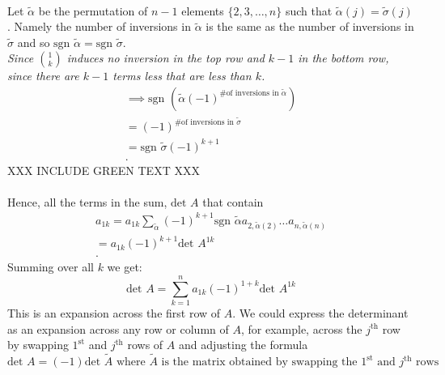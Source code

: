 \documentclass{report}
\begin{document}
{      \\
      Let $ \tilde{ \alpha}   $ be the permutation of $ n-1$ elements  $ \{ 2,3,\ldots,n \}$ such that $ \tilde{ \alpha}   \left( j \right) = \tilde{ \sigma}   \left( j \right) $. Namely the number of inversions in $ \tilde{ \alpha}   $ is the same as the number of inversions in $ \tilde{ \sigma}   $ and so $ \text{sgn } \tilde{ \alpha}   =\text{sgn } \tilde{ \sigma}   $.\\
      \textit{Since $ \binom{1}{k}$ induces no inversion in the top row and $ k-1$ in the bottom row, since there are $ k-1$ terms less that are less than $ k$.}\\
 \begin{align*}
   \implies \text{sgn } \left( \tilde{ \alpha}   \left( -1 \right) ^{\text{\# of inversions in } \tilde{ \alpha}   } \right)\\
   = \left( -1 \right) ^{\text{\# of inversions in } \tilde{ \sigma}   }\\
   = \text{sgn } \tilde{ \sigma}   \left( -1 \right) ^{k+1}\\
 .\end{align*}
            XXX INCLUDE GREEN TEXT XXX\\
            \\
Hence, all the terms in the sum, $ \text{det } A$ that contain 
\begin{align*}
        a_{1k} = a_{1k} \sum\limits_{  \tilde{ \alpha}   }^{} \left( -1 \right) ^{k+1} \text{sgn } \tilde{ \alpha}  a_{2,\tilde{ \alpha}   \left( 2 \right) }\ldots a_{n,\tilde{ \alpha}   \left( n \right) }\\
        = a_{1k} \left( -1 \right) ^{k+1} \text{det } A^{1k}\\
.\end{align*}
Summing over all $ k$ we get:
\[
        \text{det } A = \sum\limits_{k=1}^{n} a_{1k} \left( -1 \right) ^{1+k} \text{det } A^{1k}
\]
This is an expansion across the first row of $ A$. We could express the determinant as an expansion across any row or column of $ A$, for example, across the $ j^{\text{th}}$ row  by swapping $1^{\text{st}}$ and $j^{\text{th}}$ rows of $ A$ and adjusting  the formula
\[
        \text{det } A = \left( -1 \right) \text{det } \tilde{ A}   \text{ where } \tilde{ A}   \text{ is the matrix obtained by swapping the $1^{\text{st}}$ and $j^{\text{th}}$ rows} 
                              
\]}
\end{document}
